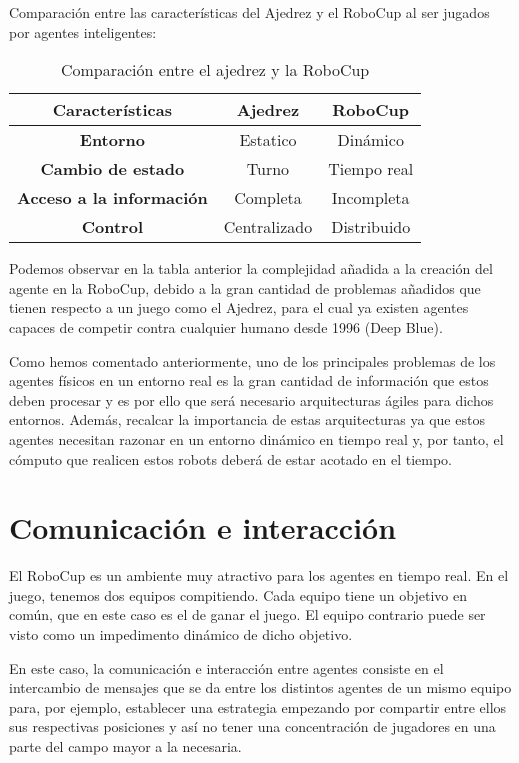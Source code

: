 \documentclass[11pt,oneside,a4paper]{book}
\begin{document}
Comparación entre las características del Ajedrez y el RoboCup al ser jugados por agentes inteligentes:
\begin{table}[H]
\begin{center}
\begin{tabular}{| c | c | c| }
\hline
\textbf{Características}  & \textbf{Ajedrez} &\textbf{RoboCup} \\\hline
 \textbf{Entorno} & Estatico & Dinámico \\
  \textbf{Cambio de estado} & Turno & Tiempo real \\
  \textbf{Acceso a la información} & Completa & Incompleta \\
 \textbf{Control} & Centralizado & Distribuido \\
 \hline
\end{tabular}
\caption{Comparación entre el ajedrez y la RoboCup}
\end{center}

\end{table}

Podemos observar en la tabla anterior la complejidad añadida a la creación del agente en la RoboCup, debido a la gran cantidad de problemas añadidos que tienen respecto a un juego como el Ajedrez, para el cual ya existen agentes capaces de competir contra cualquier humano desde 1996 (Deep Blue).


Como hemos comentado anteriormente, uno de los principales problemas de los agentes físicos en un entorno real es la gran cantidad de información que estos deben procesar y es por ello que será necesario arquitecturas ágiles para dichos entornos. Además, recalcar la importancia de estas arquitecturas ya que estos agentes necesitan razonar en un entorno dinámico en tiempo real y, por tanto, el cómputo que realicen estos robots deberá de estar acotado en el tiempo.

\section{Comunicación e interacción}
El RoboCup es un ambiente muy atractivo para los agentes en tiempo real. En el juego, tenemos dos equipos compitiendo. Cada equipo tiene un objetivo en común, que en este caso es el de ganar el juego. El equipo contrario puede ser visto como un impedimento dinámico de dicho objetivo. 

En este caso, la comunicación e interacción entre agentes consiste en el intercambio de mensajes que se da entre los distintos agentes de un mismo equipo para, por ejemplo, establecer una estrategia empezando por compartir entre ellos sus respectivas posiciones y así no tener una concentración de jugadores en una parte del campo mayor a la necesaria.
\end{document}
